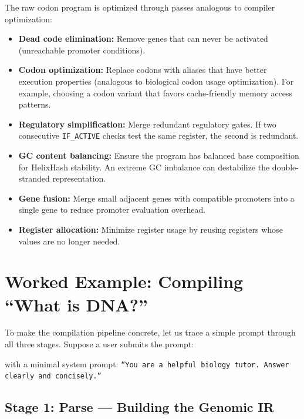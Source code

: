 The raw codon program is optimized through passes analogous to compiler optimization:

\begin{itemize}[leftmargin=1.8em]
  \item \textbf{Dead code elimination:} Remove genes that can never be activated (unreachable promoter conditions).
  \item \textbf{Codon optimization:} Replace codons with aliases that have better execution properties (analogous to biological codon usage optimization). For example, choosing a codon variant that favors cache-friendly memory access patterns.
  \item \textbf{Regulatory simplification:} Merge redundant regulatory gates. If two consecutive \texttt{IF\_ACTIVE} checks test the same register, the second is redundant.
  \item \textbf{GC content balancing:} Ensure the program has balanced base composition for HelixHash stability. An extreme GC imbalance can destabilize the double-stranded representation.
  \item \textbf{Gene fusion:} Merge small adjacent genes with compatible promoters into a single gene to reduce promoter evaluation overhead.
  \item \textbf{Register allocation:} Minimize register usage by reusing registers whose values are no longer needed.
\end{itemize}


\section{Worked Example: Compiling ``What is DNA?''}
\label{sec:codon-worked-example}

To make the compilation pipeline concrete, let us trace a simple prompt through all three stages. Suppose a user submits the prompt:

\begin{center}
\end{center}

with a minimal system prompt: \texttt{``You are a helpful biology tutor. Answer clearly and concisely.''}

\subsection{Stage 1: Parse --- Building the Genomic IR}

